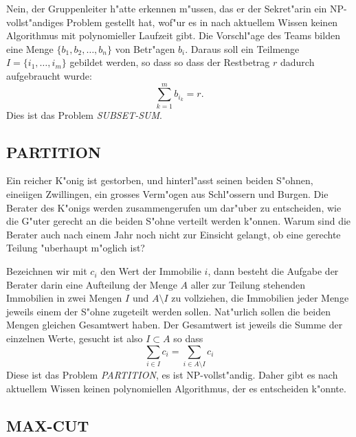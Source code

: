 \medskip

Nein, der Gruppenleiter h"atte erkennen m"ussen, das er der Sekret"arin
ein NP-vollst"andiges Problem gestellt hat, wof"ur es in nach aktuellem
Wissen keinen Algorithmus mit polynomieller Laufzeit gibt. Die Vorschl"age
des Teams bilden eine Menge $\{b_1,b_2,\dots,b_n\}$ von Betr"agen $b_i$.
Daraus soll ein Teilmenge $I=\{i_1,\dots,i_m\}$ gebildet werden, so dass
so dass der Restbetrag $r$ dadurch aufgebraucht wurde:
\[
\sum_{k=1}^m b_{i_k} = r.
\]
Dies ist das Problem {\it SUBSET-SUM}.

\subsection{PARTITION}
Ein reicher K"onig ist gestorben, und hinterl"asst seinen beiden
S"ohnen, eineiigen Zwillingen, ein grosses Verm"ogen aus Schl"ossern
und Burgen. Die Berater des K"onigs werden zusammengerufen um
dar"uber zu entscheiden, wie die G"uter gerecht an die beiden S"ohne
verteilt werden k"onnen. Warum sind die Berater auch nach einem Jahr
noch nicht zur Einsicht gelangt, ob eine gerechte Teilung "uberhaupt
m"oglich ist?

Bezeichnen wir mit $c_i$ den Wert der Immobilie $i$, dann besteht
die Aufgabe der Berater darin eine Aufteilung der Menge $A$ aller 
zur Teilung stehenden Immobilien in zwei Mengen $I$ und $A\setminus I$
zu vollziehen, die Immobilien jeder Menge jeweils einem der S"ohne zugeteilt
werden sollen.
Nat"urlich sollen die beiden Mengen gleichen Gesamtwert haben.
Der Gesamtwert ist jeweils die Summe der einzelnen Werte, gesucht ist also
$I\subset A$ so dass
\[
\sum_{i\in I}c_i =\sum_{i\in A\setminus I}c_i
\]
Diese ist das Problem {\it PARTITION}, es ist NP-vollst"andig.
Daher gibt es nach aktuellem Wissen keinen polynomiellen Algorithmus,
der es entscheiden k"onnte.


\subsection{MAX-CUT}
